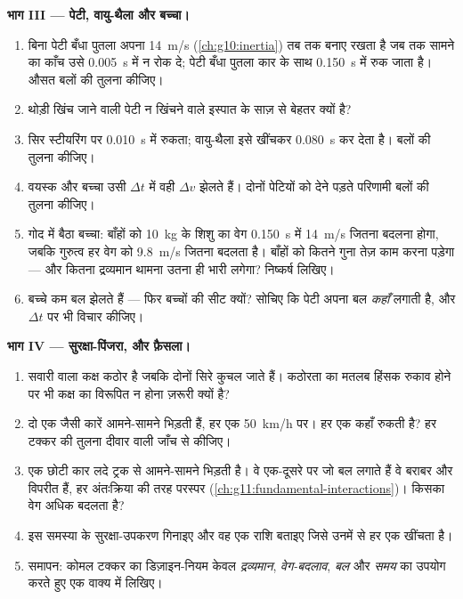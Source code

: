 \begin{problem}
\medskip
\noindent\textbf{भाग III --- पेटी, वायु-थैला और बच्चा।}
\begin{enumerate}[resume]
  \item बिना पेटी बँधा पुतला अपना \qty{14}{m/s} (\cref{ch:g10:inertia}) तब तक बनाए रखता है जब तक
        सामने का काँच उसे \qty{0.005}{s} में न रोक दे; पेटी बँधा पुतला कार के साथ
        \qty{0.150}{s} में रुक जाता है। औसत बलों की तुलना कीजिए।
  \item थोड़ी खिंच जाने वाली पेटी न खिंचने वाले इस्पात के साज़ से बेहतर क्यों
        है?
  \item सिर स्टीयरिंग पर \qty{0.010}{s} में रुकता; वायु-थैला इसे खींचकर \qty{0.080}{s} कर
        देता है। बलों की तुलना कीजिए।
  \item वयस्क और बच्चा उसी $\Delta t$ में वही $\Delta v$ झेलते हैं। दोनों पेटियों
        को देने पड़ते परिणामी बलों की तुलना कीजिए।
  \item गोद में बैठा बच्चा: बाँहों को \qty{10}{kg} के शिशु का वेग \qty{0.150}{s} में
        \qty{14}{m/s} जितना बदलना होगा, जबकि गुरुत्व हर  वेग को \qty{9.8}{m/s}
        जितना बदलता है। बाँहों को कितने गुना तेज़ काम करना पड़ेगा --- और
        कितना द्रव्यमान थामना उतना ही भारी लगेगा? निष्कर्ष लिखिए।
  \item बच्चे कम बल झेलते हैं --- फिर बच्चों की सीट क्यों? सोचिए कि
        पेटी अपना बल \emph{कहाँ} लगाती है, और $\Delta t$ पर भी विचार
        कीजिए।
\end{enumerate}

\medskip
\noindent\textbf{भाग IV --- सुरक्षा-पिंजरा, और फ़ैसला।}
\begin{enumerate}[resume]
  \item सवारी वाला कक्ष कठोर है जबकि दोनों सिरे कुचल जाते हैं। कठोरता का
        मतलब हिंसक रुकाव होने पर भी कक्ष का विरूपित न होना ज़रूरी क्यों है?
  \item दो एक जैसी कारें आमने-सामने भिड़ती हैं, हर एक \qty{50}{km/h} पर। हर एक कहाँ
        रुकती है? हर टक्कर की तुलना दीवार वाली जाँच से कीजिए।
  \item एक छोटी कार लदे ट्रक से आमने-सामने भिड़ती है। वे एक-दूसरे पर जो
        बल लगाते हैं वे बराबर और विपरीत हैं, हर अंतःक्रिया की तरह
        परस्पर (\cref{ch:g11:fundamental-interactions})। किसका वेग अधिक बदलता है?
  \item इस समस्या के सुरक्षा-उपकरण गिनाइए और वह एक राशि बताइए जिसे उनमें से
        हर एक खींचता है।
  \item समापन: कोमल टक्कर का डिज़ाइन-नियम केवल \emph{द्रव्यमान},
        \emph{वेग-बदलाव}, \emph{बल} और \emph{समय} का उपयोग करते हुए
        एक वाक्य में लिखिए।
\end{enumerate}
\end{problem}
